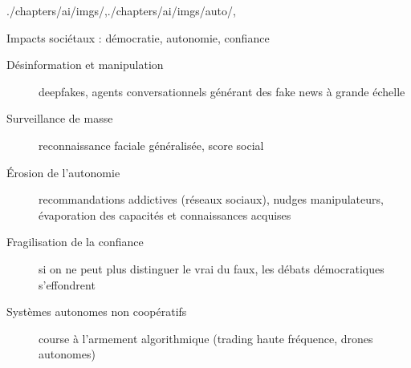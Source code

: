 \begin{graphicspathcontext}{{./chapters/ai/imgs/},{./chapters/ai/imgs/auto/},\old}

\begin{frame}{{Impacts sociétaux :} démocratie, autonomie, confiance}
	\begin{description}
	\item[Désinformation et manipulation] deepfakes, agents conversationnels générant des fake news à grande échelle
	\vspace{.25cm}
	\item[Surveillance de masse] reconnaissance faciale généralisée, score social
	\vspace{.25cm}
	\item[Érosion de l'autonomie] recommandations addictives (réseaux sociaux), nudges manipulateurs, évaporation des capacités et connaissances acquises
	\vspace{.25cm}
	\item[Fragilisation de la confiance] si on ne peut plus distinguer le vrai du faux, les débats démocratiques s'effondrent
	\vspace{.25cm}
	\item[Systèmes autonomes non coopératifs] course à l'armement algorithmique (trading haute fréquence, drones autonomes)
	\end{description}
	\vspace{.5cm}
\end{frame}

\end{graphicspathcontext}

\endinput
